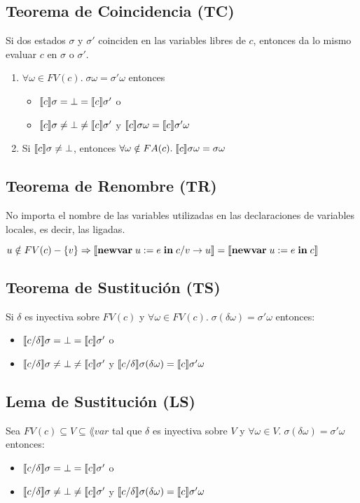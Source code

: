   \subsection*{Teorema de Coincidencia (TC)}
    \PN Si dos estados $\sigma$ y $\sigma'$ coinciden en las variables libres de $c$, entonces da lo mismo evaluar $c$ en $\sigma$ o $\sigma'$.
    \begin{enumerate}
      \item $\forall \omega \in FV(c) . \; \sigma \omega = \sigma' \omega$ entonces
        \begin{itemize}
          \item $\llbracket c\rrbracket \sigma = \bot = \llbracket c\rrbracket \sigma'$ o
          \item $\llbracket c\rrbracket \sigma \neq \bot \neq \llbracket c\rrbracket \sigma'$ y $\llbracket c\rrbracket \sigma \omega = \llbracket c\rrbracket \sigma' \omega$
        \end{itemize}
      \item Si $\llbracket c\rrbracket \sigma \neq \bot$, entonces $\forall \omega \notin FA(c) . \; \llbracket c\rrbracket \sigma \omega = \sigma \omega$
    \end{enumerate}
  
  \subsection*{Teorema de Renombre (TR)}
    \PN No importa el nombre de las variables utilizadas en las declaraciones de variables locales, es decir, las ligadas.

    \vspace{3mm}
    \PN $u \notin FV(c) - \{v\} \Rightarrow \llbracket\textbf{newvar}\;u := e\;\textbf{in}\;c/v\rightarrow u\rrbracket = \llbracket\textbf{newvar}\;u := e\;\textbf{in}\;c\rrbracket$

  \subsection*{Teorema de Sustitución (TS)}
    \PN Si $\delta$ es inyectiva sobre $FV(c)$ y $\forall \omega \in FV(c) . \; \sigma(\delta \omega) = \sigma' \omega$ entonces:
    \begin{itemize}
      \item $\llbracket c/\delta\rrbracket \sigma = \bot = \llbracket c\rrbracket \sigma'$ o
      \item $\llbracket c/\delta\rrbracket \sigma \neq \bot \neq \llbracket c\rrbracket \sigma'$ y $\llbracket c/\delta\rrbracket \sigma (\delta \omega) = \llbracket c\rrbracket \sigma' \omega$
    \end{itemize}
    
  \subsection*{Lema de Sustitución (LS)}
    \PN Sea $FV(c) \subseteq V \subseteq \lang{var}$ tal que $\delta$ es inyectiva sobre $V$ y $\forall \omega \in V . \; \sigma(\delta \omega) = \sigma' \omega$ entonces:
    \begin{itemize}
      \item $\llbracket c/\delta\rrbracket \sigma = \bot = \llbracket c\rrbracket \sigma'$ o
      \item $\llbracket c/\delta\rrbracket \sigma \neq \bot \neq \llbracket c\rrbracket \sigma'$ y $\llbracket c/\delta\rrbracket \sigma (\delta \omega) = \llbracket c\rrbracket \sigma' \omega$
    \end{itemize}
    
